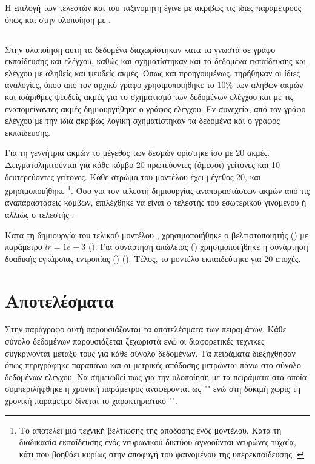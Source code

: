Η επιλογή των τελεστών και του ταξινομητή έγινε με ακριβώς τις ίδιες παραμέτρους όπως και στην 
υλοποίηση με .

\subsection{}

Στην υλοποίηση αυτή τα δεδομένα διαχωρίστηκαν κατα τα γνωστά σε γράφο εκπαίδευσης και ελέγχου,
καθώς και σχηματίστηκαν και τα δεδομένα εκπαίδευσης και ελέγχου με αληθείς και ψευδείς ακμές.
Όπως και προηγουμένως, τηρήθηκαν οι ίδιες αναλογίες, όπου από τον αρχικό γράφο χρησιμοποιήθηκε
το \(10\%\) των αληθών ακμών και ισάριθμες ψευδείς ακμές για το σχηματισμό των δεδομένων ελέγχου
και με τις εναπομείναντες ακμές δημιουργήθηκε ο γράφος ελέγχου. Εν συνεχεία, από τον γράφο ελέγχου
με την ίδια ακριβώς λογική σχηματίστηκαν τα δεδομένα και ο γράφος εκπαίδευσης.

Για τη γεννήτρια ακμών το μέγεθος των δεσμών ορίστηκε ίσο με \(20\) ακμές. Δειγματοληπτούνται
για κάθε κόμβο 20 πρωτεύοντες (άμεσοι) γείτονες και 10 δευτερεύοντες γείτονες. Κάθε στρώμα του
μοντέλου έχει μέγεθος 20, και χρησιμοποιήθηκε  \footnote{Το 
 αποτελεί μια τεχνική βελτίωσης της απόδοσης ενός μοντέλου. Κατα τη διαδικασία
εκπαίδευσης ενός νευρωνικού δικτύου αγνοούνται νευρώνες τυχαία, κάτι που βοηθάει κυρίως στην
αποφυγή του φαινομένου της υπερεκπαίδευσης \cite{DataMining}.}. Όσο για τον τελεστή δημιουργίας
αναπαραστάσεων ακμών από τις αναπαραστάσεις κόμβων, επιλέχθηκε να είναι ο τελεστής του εσωτερικού
γινομένου ή αλλιώς ο τελεστής .

Κατα τη δημιουργία του τελικού μοντέλου , χρησιμοποιήθηκε ο βελτιστοποιητής 
()  με παράμετρο \(lr = 1e-3\) (). 
Για συνάρτηση απώλειας () χρησιμοποιήθηκε η συνάρτηση δυαδικής εγκάρσιας
εντροπίας () (). Τέλος,
το μοντέλο εκπαιδεύτηκε για 20 εποχές.

\section{Αποτελέσματα}

Στην παράγραφο αυτή παρουσιάζονται τα αποτελέσματα των πειραμάτων. Κάθε σύνολο δεδομένων 
παρουσιάζεται ξεχωριστά ενώ οι διαφορετικές τεχνικες συγκρίνονται μεταξύ τους για κάθε σύνολο
δεδομένων. Τα πειράματα διεξήχθησαν όπως περιγράφηκε παραπάνω και οι μετρικές απόδοσης μετρώνται 
πάνω στο  σύνολο δεδομένων ελέγχου. Να σημειωθεί πως για την υλοποίηση με  τα πειράματα στα οποία
συμπεριλήφθηκε η χρονική παράμετρος  αναφέρονται ως "" ενώ στη δοκιμή χωρίς τη χρονική
παράμετρο δίνεται το χαρακτηριστικό "".

